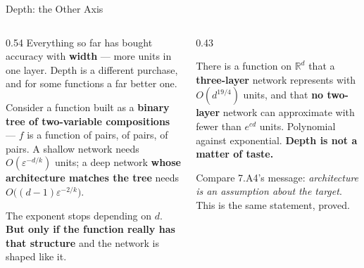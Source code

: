 \begin{frame}{Depth: the Other Axis}
\begin{columns}[T]
\begin{column}{0.54\textwidth}
\small
Everything so far has bought accuracy with \textbf{width} --- more units in one layer. Depth is a different purchase, and for some functions a far better one.
\medskip

Consider a function built as a \textbf{binary tree of two-variable compositions} --- $f$ is a function of pairs, of pairs, of pairs. A shallow network needs $O(\varepsilon^{-d/k})$ units; a deep network \textbf{whose architecture matches the tree} needs $O\bigl((d-1)\varepsilon^{-2/k}\bigr)$.
\medskip

The exponent stops depending on $d$. \textbf{But only if the function really has that structure} and the network is shaped like it.
\end{column}
\begin{column}{0.43\textwidth}
\begin{conceptbox}[title=\textbf{Theorem (Eldan \& Shamir 2016)}]\small
There is a function on $\mathbb{R}^{d}$ that a \textbf{three-layer} network represents with $O(d^{19/4})$ units, and that \textbf{no two-layer} network can approximate with fewer than $e^{cd}$ units.
\medskip
Polynomial against exponential. \textbf{Depth is not a matter of taste.}
\end{conceptbox}
\medskip
\begin{examplebox}\footnotesize
Compare 7.A4's message: \emph{architecture is an assumption about the target}. This is the same statement, proved.
\end{examplebox}
\end{column}
\end{columns}
\vspace{1mm}
\end{frame}

